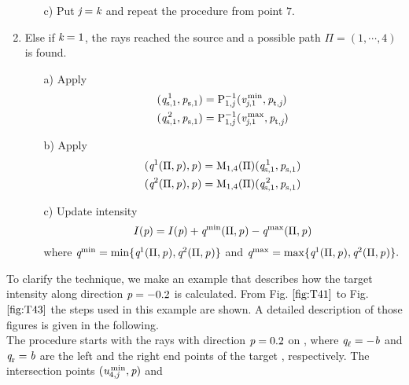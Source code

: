 \begin{enumerate}
\begin{itemize}
\item[c)] Put $\textit{j}=\textit{k}$ and repeat the procedure from point $7$.
\end{itemize}
\item Else if $\textit{k}=1$, the rays reached the source and a possible path $\Pi = (1, \cdots, 4)$ is found. 
\begin{itemize}
\item[a)]
Apply 
\begin{equation*}
\begin{aligned}
(\textit{q}_{\textrm{s,} \textit{$1$}}^{\,1}, \textit{p}_{\textrm{s,} \textit{$1$}})& = \mathrm{P}_{{1,\textit{j}}}^{-1}(\textit{v}_{\textit{j}, 1}^\textrm{\,min}, \textit{p}_{\textrm{t,} \textit{\textit{j}}})  \\
(\textit{q}_{\textrm{s,} \textit{$1$}}^{\,2}, \textit{p}_{\textrm{s,} \textit{$1$}}) & =\mathrm{P}_{{1,\textit{j}}}^{-1}(\textit{v}_{\textit{j}, 1}^\textrm{\,max}, \textit{p}_{\textrm{t,} \textit{\textit{j}}})
\end{aligned}
\end{equation*}
\item[b)] Apply 
\begin{equation*}
\begin{aligned}
 (\textit{q}_{\textrm{} \textit{}}^{1}(\Pi, \textit{p}_{\textrm{} \textit{}}), \textit{p}_{\textrm{} \textit{}})&= \mathrm{M}_{1,4}(\Pi)(\textit{q}_{\textrm{s,} \textit{$1$}}^{\,1}, \textit{p}_{\textrm{s,} \textit{$1$}})\\
 (\textit{q}_{\textrm{} \textit{}}^{2}(\Pi, \textit{p}_{\textrm{} \textit{}}), \textit{p}_{\textrm{} \textit{}})&= \mathrm{M}_{1,4}(\Pi)(\textit{q}_{\textrm{s,} \textit{$1$}}^{\,2}, \textit{p}_{\textrm{s,} \textit{$1$}})
\end{aligned}
\end{equation*}
\item[c)] Update intensity $$I(\textit{p}) = I(\textit{p})+\textit{q}_{\textrm{} \textit{}}^{\textrm{min}}(\Pi, \textit{p}_{\textrm{} \textit{}})- \textit{q}_{\textrm{} \textit{}}^{\textrm{max}}(\Pi, \textit{p}_{\textrm{} \textit{}})$$
where $\textit{q}_{\textrm{} \textit{}}^\textrm{min} = \min\{ \textit{q}_{\textrm{} \textit{}}^{1}(\Pi, \textit{p}_{\textrm{} \textit{}}), \textit{q}_{\textrm{} \textit{}}^{2}(\Pi, \textit{p}_{\textrm{} \textit{}})\}$ and $\textit{q}_{\textrm{} \textit{}}^\textrm{max} = \max\{\textit{q}_{\textrm{} \textit{}}^{1}(\Pi, \textit{p}_{\textrm{} \textit{}}), \textit{q}_{\textrm{} \textit{}}^{2}(\Pi, \textit{p}_{\textrm{} \textit{}})\}.$
\end{itemize}
\end{enumerate}
\indent
To clarify the technique, we make an example that describes how the target intensity along direction $\textit{p}= -0.2$ is calculated.
From Fig. $\ref{fig:T41}$ to Fig. $\ref{fig:T43}$ the steps used in this example are shown.
A detailed description of those figures is given in the following.
\\ \indent The procedure starts with the rays with direction $\textit{p} = 0.2$ on , where $\textit{q}_\ell= -\textit{b}$ and
$\textit{q}_\textrm{r}= \textit{b}$ are the left and the right end points of the target , respectively.
 The intersection points $(\textit{u}_{4,\textit{j}}^\textrm{\,min}, \textit{p})$ and
